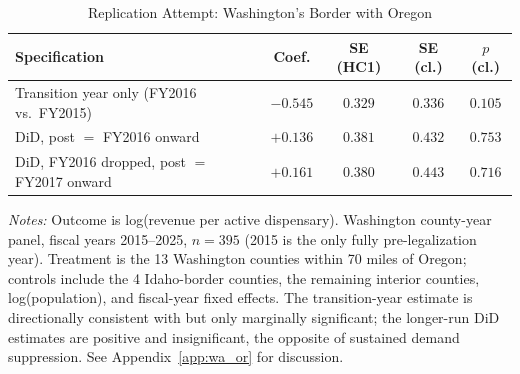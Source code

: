 \begin{table}[htbp]
\centering
\caption{Replication Attempt: Washington's Border with Oregon}
\label{tab:wa_or}
\small
\begin{tabular}{lcccc}
\toprule
Specification & Coef. & SE (HC1) & SE (cl.) & $p$ (cl.) \\
\midrule
Transition year only (FY2016 vs.\ FY2015) & $-0.545$ & $0.329$ & $0.336$ & $0.105$ \\
DiD, post $=$ FY2016 onward & $+0.136$ & $0.381$ & $0.432$ & $0.753$ \\
DiD, FY2016 dropped, post $=$ FY2017 onward & $+0.161$ & $0.380$ & $0.443$ & $0.716$ \\
\bottomrule
\end{tabular}
\begin{minipage}{0.95\textwidth}
\vspace{0.3em}
\footnotesize
\textit{Notes:} Outcome is log(revenue per active dispensary). Washington county-year panel, fiscal years
2015--2025, $n=395$ (2015 is the only fully pre-legalization year). Treatment is the 13 Washington counties
within 70 miles of Oregon; controls include the 4 Idaho-border counties, the remaining interior counties,
log(population), and fiscal-year fixed effects. The transition-year estimate is directionally consistent with
\citet{HansenMillerWeber2020} but only marginally significant; the longer-run DiD estimates are positive and
insignificant, the opposite of sustained demand suppression. See Appendix~\ref{app:wa_or} for discussion.
\end{minipage}
\end{table}
